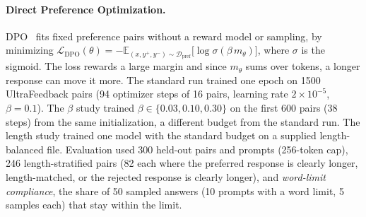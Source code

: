 \documentclass{article}
\begin{document}
\paragraph{Direct Preference Optimization.} DPO~\citep{rafailov2023dpo} fits fixed preference pairs without a reward model or sampling, by minimizing $\mathcal{L}_\text{DPO}(\theta)= -\mathbb{E}_{(x, y^+, y^-) \sim \mathcal D_{\text{pref}}}\big[\log \sigma(\beta\, m_\theta)\big]$, where $\sigma$ is the sigmoid. The loss rewards a large margin and since $m_\theta$ sums over tokens, a longer response can move it more. The standard run trained one epoch on 1500 UltraFeedback pairs (94 optimizer steps of 16 pairs, learning rate $2\times10^{-5}$, $\beta = 0.1$). The $\beta$ study trained $\beta \in \{0.03, 0.10, 0.30\}$ on the first 600 pairs (38 steps) from the same initialization, a different budget from the standard run. The length study trained one model with the standard budget on a supplied length-balanced file. Evaluation used 300 held-out pairs and prompts (256-token cap), 246 length-stratified pairs (82 each where the preferred response is clearly longer, length-matched, or the rejected response is clearly longer), and \emph{word-limit compliance}, the share of 50 sampled answers (10 prompts with a word limit, 5 samples each) that stay within the limit.
\end{document}
